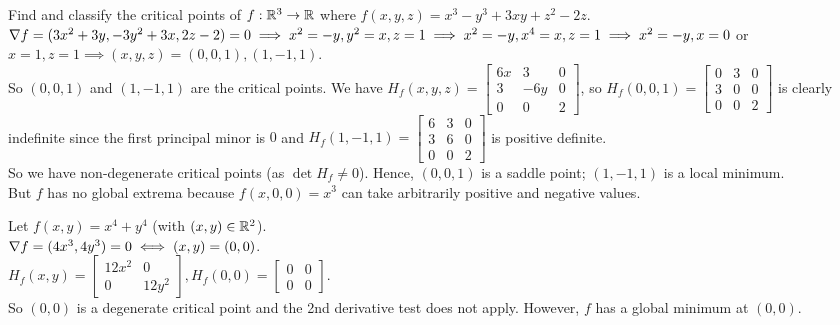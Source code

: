 \begin{example}
    Find and classify the critical points of $f: \mathbb{R}^3 \to \mathbb{R}$ where $f(x,y,z) = x^3 - y^3 + 3xy + z^2 - 2z$. \\
    $\nabla f = (3x^2 + 3y, -3y^2 + 3x, 2z - 2) = 0 \implies x^2 = -y, y^2 = x, z = 1 \implies x^2 = -y, x^4 = x, z = 1 \implies x^2 = -y, x=0$ or $x=1, z=1 \implies (x,y,z) = (0,0,1), (1,-1,1)$. \\
    So $(0,0,1)$ and $(1,-1,1)$ are the critical points.
    We have $H_f(x,y,z) = \begin{bmatrix}
        6x & 3 & 0 \\ 3 & -6y & 0 \\ 0 & 0 & 2
    \end{bmatrix}$, so $H_f(0,0,1) = \begin{bmatrix}
        0 & 3 & 0 \\ 3 & 0 & 0 \\ 0 & 0 & 2
    \end{bmatrix}$ is clearly indefinite since the first principal minor is $0$ and $H_f(1,-1,1) = \begin{bmatrix}
        6 & 3 & 0 \\ 3 & 6 & 0 \\ 0 & 0 & 2
    \end{bmatrix}$ is positive definite. \\
    So we have non-degenerate critical points (as $\det H_f \neq 0$). Hence, $(0,0,1)$ is a saddle point; $(1,-1,1)$ is a local minimum. \\
    But $f$ has no global extrema because $f(x,0,0) = x^3$ can take arbitrarily positive and negative values.
\end{example}

\begin{example}
    Let $f(x,y) = x^4 + y^4$ (with $(x,y) \in \mathbb{R}^2$). \\
    $\nabla f = (4x^3, 4y^3) = 0 \iff (x,y) = (0,0)$. \\
    $H_f(x,y) = \begin{bmatrix}
        12x^2 & 0 \\ 0 & 12y^2
    \end{bmatrix}, H_f(0,0) = \begin{bmatrix}
        0 & 0 \\ 0 & 0
    \end{bmatrix}$. \\
    So $(0,0)$ is a degenerate critical point and the 2nd derivative test does not apply. However, $f$ has a global minimum at $(0,0)$.
\end{example}